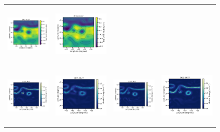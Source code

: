 \begin{figure}[t!]
\begin{center}
\begin{tabular}{cccc}
\includegraphics[trim={0 0 42mm 0},clip, width=3.2cm,height=3cm]{content/figures/maps/sla/dc20a_bfnqg_sla.png} &
\includegraphics[width=4.0cm,height=3cm]{content/figures/maps/sla/dc20a_4dvarnet_sla.png} \\
\vspace{-2mm}
\includegraphics[trim={0 0 42mm 0},clip, width=3.20cm,height=3cm]{content/figures/maps/ke/dc20a/nadir4/dc20a_nemo_ke.png} &
\includegraphics[trim={0 0 42mm 0},clip, width=3.2cm,height=3cm]{content/figures/maps/ke/dc20a/nadir4/dc20a_miost_ke.png} &
\includegraphics[trim={0 0 42mm 0},clip, width=3.2cm,height=3cm]{content/figures/maps/ke/dc20a/nadir4/dc20a_bfnqg_ke.png} &
\includegraphics[width=4.0cm,height=3cm]{content/figures/maps/ke/dc20a/nadir4/dc20a_4dvarnet_ke.png}  \\

\end{tabular}
\end{center}
\end{figure}
